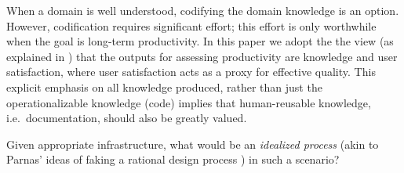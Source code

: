 \documentclass[sigconf,review]{acmart}
\begin{document}
When a domain is well understood, codifying the domain knowledge is an option.
However, codification requires significant effort; this effort is only
worthwhile when the goal is long-term productivity.  In this paper we adopt the
the view (as explained in \cite{SmithAndCarette2020arXiv}) that the outputs for
assessing productivity are knowledge and user satisfaction, where user
satisfaction acts as a proxy for effective quality. This explicit emphasis on
all knowledge produced, rather than just the operationalizable knowledge (code)
implies that human-reusable knowledge, i.e.\ documentation, should also be
greatly valued.

Given appropriate infrastructure, what would be an \emph{idealized process}
(akin to Parnas' ideas of faking a rational design process \cite{Parnas1986})
in such a scenario?
\end{document}

